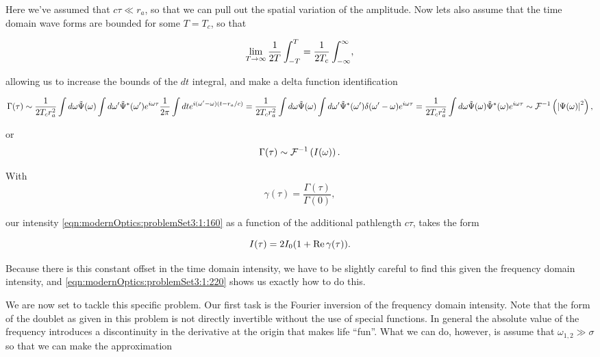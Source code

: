 {Here we've assumed that $c \tau \ll r_a$, so that we can pull out the spatial variation of the amplitude.  Now lets also assume that the time domain wave forms are bounded for some $T = T_c$, so that

\begin{dmath}\label{eqn:modernOptics:problemSet3:1:140}
\lim_{T \rightarrow \infty} \inv{2T} \int_{-T}^T = \inv{2 T_c} \int_{-\infty}^\infty,
\end{dmath}

allowing us to increase the bounds of the $dt$ integral, and make a delta function identification

\begin{dmath}\label{eqn:modernOptics:problemSet3:1:120b}
\Gamma(\tau) \sim
\inv{2 T_c r_a^2} 
\int d\omega \tilde{\Psi}(\omega) 
\int d\omega' \tilde{\Psi}^\conj(\omega') 
e^{i \omega \tau} 
\inv{2\pi}
\int 
dt
e^{i (\omega' - \omega)( t - r_a/c )} 
=
\inv{2 T_c r_a^2} 
\int d\omega \tilde{\Psi}(\omega) 
\int d\omega' \tilde{\Psi}^\conj(\omega') \delta(\omega' - \omega)
e^{i \omega \tau} 
=
\inv{2 T_c r_a^2} 
\int d\omega \tilde{\Psi}(\omega) 
\tilde{\Psi}^\conj(\omega) 
e^{i \omega \tau} 
\sim \FF^{-1} \left( \Abs{\Psi(\omega)}^2 \right),
\end{dmath}

or
\begin{dmath}\label{eqn:modernOptics:problemSet3:1:180}
\Gamma(\tau) \sim \FF^{-1} \left( I(\omega) \right).
\end{dmath}

With
\begin{dmath}\label{eqn:modernOptics:problemSet3:1:200}
\gamma(\tau) = \frac{\Gamma(\tau)}{\Gamma(0)},
\end{dmath}

our intensity \ref{eqn:modernOptics:problemSet3:1:160} as a function of the additional pathlength $c \tau$, takes the form

\begin{dmath}\label{eqn:modernOptics:problemSet3:1:220}
I(\tau) = 2 I_0( 1 + \Real \gamma(\tau) ).
\end{dmath}

Because there is this constant offset in the time domain intensity, we have to be slightly careful to find this given the frequency domain intensity, and \ref{eqn:modernOptics:problemSet3:1:220} shows us exactly how to do this.


We are now set to tackle this specific problem.  Our first task is the Fourier inversion of the frequency domain intensity.  Note that the form of the doublet as given in this problem is not directly invertible without the use of special functions.  In general the absolute value of the frequency introduces a discontinuity in the derivative at the origin that makes life ``fun''.  What we can do, however, is assume that $\omega_{1,2} \gg \sigma$ so that we can make the approximation

}
